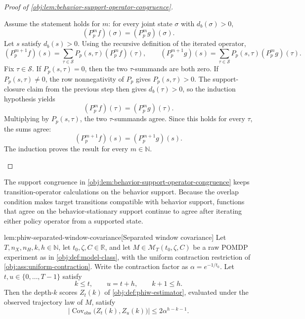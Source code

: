 \documentclass[11pt]{article}
\begin{document}
\begin{proof}[Proof of \cref{obj:lem:behavior-support-operator-congruence}]
\begin{enumerate}
Assume the statement holds for \(m\): for every joint state \(\sigma\) with \(d_b(\sigma)>0\),
\[
(P_p^m f)(\sigma)=(P_p^m g)(\sigma).
\]
Let \(s\) satisfy \(d_b(s)>0\).  Using the recursive definition of the iterated operator,
\[
(P_p^{m+1}f)(s)
=
\sum_{\tau\in\mathcal S}P_p(s,\tau)(P_p^m f)(\tau),
\qquad
(P_p^{m+1}g)(s)
=
\sum_{\tau\in\mathcal S}P_p(s,\tau)(P_p^m g)(\tau).
\]
Fix \(\tau\in\mathcal S\).  If \(P_p(s,\tau)=0\), then the two \(\tau\)-summands are both zero.  If \(P_p(s,\tau)\neq 0\), the row nonnegativity of \(P_p\) gives \(P_p(s,\tau)>0\).  The support-closure claim from the previous step then gives \(d_b(\tau)>0\), so the induction hypothesis yields
\[
(P_p^m f)(\tau)=(P_p^m g)(\tau).
\]
Multiplying by \(P_p(s,\tau)\), the two \(\tau\)-summands agree.  Since this holds for every \(\tau\), the sums agree:
\[
(P_p^{m+1}f)(s)=(P_p^{m+1}g)(s).
\]
The induction proves the result for every \(m\in\mathbb N\). %
\end{enumerate}
\end{proof}

The support congruence in \cref{obj:lem:behavior-support-operator-congruence} keeps transition-operator calculations on the behavior support. Because the overlap condition makes target transitions compatible with behavior support, functions that agree on the behavior-stationary support continue to agree after iterating either policy operator from a supported state.

\begin{lemmav}{lem:phiw-separated-window-covariance}[Separated window covariance]
Let \(T,n_X,n_H,k,h\in\mathbb N\), let \(t_0,\zeta,C\in\mathbb R\), and let \(M\in\mathcal M_T(t_0,\zeta,C)\) be a raw POMDP experiment as in \cref{obj:def:model-class}, with the uniform contraction restriction of \cref{obj:ass:uniform-contraction}. Write the contraction factor as \(\alpha=e^{-1/t_0}\). Let \(t,u\in\{0,\ldots,T-1\}\) satisfy
\[
k\le t,\qquad u=t+h,\qquad k+1\le h .
\]
Then the depth-\(k\) scores \(Z_t(k)\) of \cref{obj:def:phiw-estimator}, evaluated under the observed trajectory law of \(M\), satisfy
\[
\bigl|\operatorname{Cov}_{\mathrm{obs}}\bigl(Z_t(k),Z_u(k)\bigr)\bigr|
\le
2\alpha^{h-k-1}.
\]
\end{lemmav}
\end{document}
